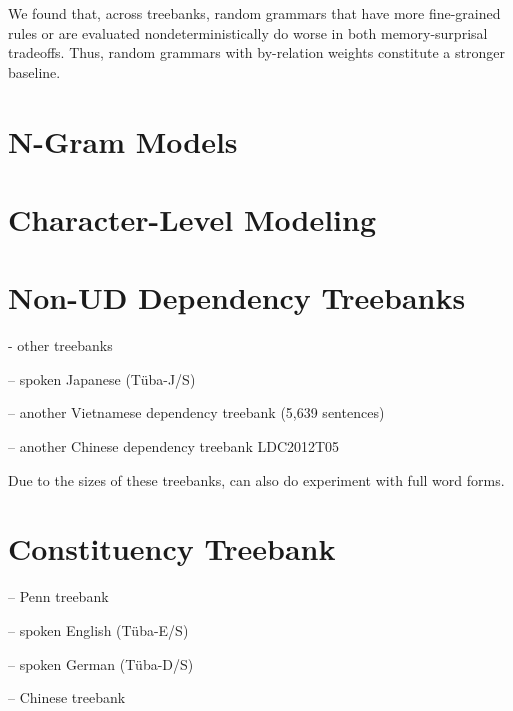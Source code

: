 \documentclass[11pt,letterpaper]{article}
\begin{document}
We found that, across treebanks, random grammars that have more fine-grained rules or are evaluated nondeterministically do worse in both memory-surprisal tradeoffs.
Thus, random grammars with by-relation weights constitute a stronger baseline.








\appendix




\section{N-Gram Models}


%
%
%



\section{Character-Level Modeling}

\section{Non-UD Dependency Treebanks}



- other treebanks



-- spoken Japanese (T{\"u}ba-J/S)

-- another Vietnamese dependency treebank \citep{nguyen-bktreebank:-2017} (5,639 sentences)


-- another Chinese dependency treebank LDC2012T05


Due to the sizes of these treebanks, can also do experiment with full word forms.


\section{Constituency Treebank}

-- Penn treebank \citep{marcus-building-1993}

-- spoken English (T{\"u}ba-E/S)

-- spoken German (T{\"u}ba-D/S)

-- Chinese treebank \citep{xue-chinese-2013}
\end{document}
